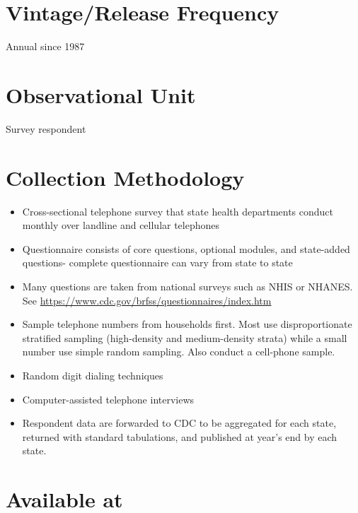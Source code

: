 \documentclass[
]{book}
\providecommand{\tightlist}{%
  \setlength{\itemsep}{0pt}\setlength{\parskip}{0pt}}
\begin{document}
\hypertarget{vintagerelease-frequency-12}{%
\section{Vintage/Release Frequency}\label{vintagerelease-frequency-12}}

Annual since 1987

\hypertarget{observational-unit-12}{%
\section{Observational Unit}\label{observational-unit-12}}

Survey respondent

\hypertarget{collection-methodology-12}{%
\section{Collection Methodology}\label{collection-methodology-12}}

\begin{itemize}
\tightlist
\item
  Cross-sectional telephone survey that state health departments conduct monthly over landline and cellular telephones
\item
  Questionnaire consists of core questions, optional modules, and state-added questions- complete questionnaire can vary from state to state
\item
  Many questions are taken from national surveys such as NHIS or NHANES. See \url{https://www.cdc.gov/brfss/questionnaires/index.htm}
\item
  Sample telephone numbers from households first. Most use disproportionate stratified sampling (high-density and medium-density strata) while a small number use simple random sampling. Also conduct a cell-phone sample.
\item
  Random digit dialing techniques
\item
  Computer-assisted telephone interviews
\item
  Respondent data are forwarded to CDC to be aggregated for each state, returned with standard tabulations, and published at year's end by each state.
\end{itemize}

\hypertarget{available-at-12}{%
\section{Available at}\label{available-at-12}}
\end{document}
